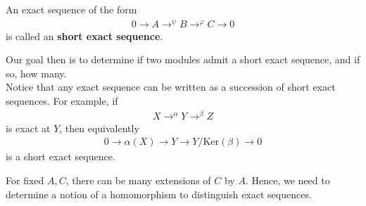 \documentclass{memoir}
\begin{document}
\begin{defn}
	An exact sequence of the form
	\begin{align*}
		0 \to A \to^{\psi }B \to^{\varphi }C \to 0
	\end{align*}
	is called an \textbf{short exact sequence}.
\end{defn}
Our goal then is to determine if two modules admit a short exact sequence, and if so, how many.\\

Notice that any exact sequence can be written as a succession of short exact sequences. For example, if
\begin{align*}
	X \to^{\alpha }Y \to^{\beta }Z
\end{align*}
is exact at \(Y\), then equivalently
\begin{align*}
	0 \to \alpha (X) \to Y \to Y / \textrm{Ker}(\beta ) \to 0
\end{align*}
is a short exact sequence.

\begin{exmp}
	
\end{exmp}

For fixed \(A,C\), there can be many extensions of \(C\) by  \(A\). Hence, we need to determine a notion of a homomorphism to distinguish exact sequences.
\end{document}
